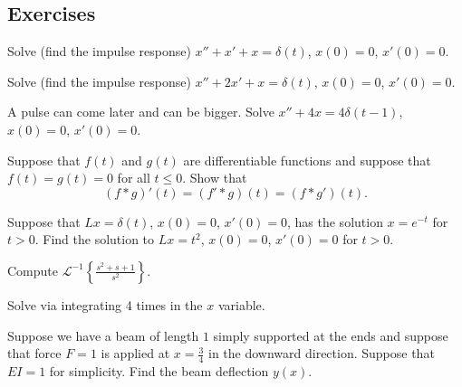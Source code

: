 \documentclass[12pt]{book}
\begin{document}
\subsection{Exercises}

\begin{exercise}
Solve (find the impulse response)
$x'' + x' + x = \delta(t)$, $x(0) = 0$, $x'(0)=0$.
\end{exercise}

\begin{exercise}
Solve (find the impulse response)
$x'' + 2 x' + x = \delta(t)$, $x(0) = 0$, $x'(0)=0$.
\end{exercise}

\begin{exercise}
A pulse can come later and can be bigger.
Solve 
$x'' + 4 x = 4\delta(t-1)$, $x(0) = 0$, $x'(0)=0$.
\end{exercise}

\begin{exercise}
Suppose that $f(t)$ and $g(t)$ are differentiable functions
and suppose that $f(t) = g(t) = 0$ for all $t \leq 0$.  Show that
\begin{equation*}
(f * g)'(t) = (f' * g)(t) = (f * g')(t) .
\end{equation*}
\end{exercise}

\begin{exercise}
Suppose that $L x = \delta(t)$, $x(0) = 0$, $x'(0) = 0$, has the solution
$x = e^{-t}$ for $t > 0$.  Find the solution to
$Lx = t^2$, $x(0) = 0$, $x'(0) = 0$ for $t > 0$.
\end{exercise}

\begin{exercise}
Compute
${\mathcal{L}}^{-1} \left\{ \frac{s^2+s+1}{s^2} \right\}$.
\end{exercise}

\begin{exercise}[challenging]
Solve  via integrating 4 times in the $x$ variable.
\end{exercise}

\begin{exercise}
Suppose we have a beam of length $1$ simply supported at the ends and
suppose that force $F=1$ is applied at $x=\frac{3}{4}$ in the downward
direction.  Suppose that $EI=1$ for simplicity.  Find the beam deflection
$y(x)$.
\end{exercise}

\setcounter{exercise}{100}
\end{document}
